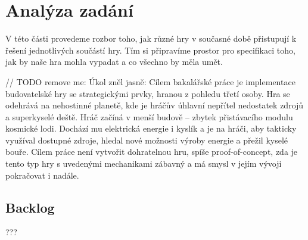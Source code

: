 
\chapter{Analýza zadání}

V této části provedeme rozbor toho, jak různé hry v současné době přistupují k řešení jednotlivých součástí hry. Tím si připravíme prostor pro specifikaci toho, jak by naše hra mohla vypadat a co všechno by měla umět.

// TODO remove me:
Úkol zněl jasně: Cílem bakalářské práce je implementace budovatelské hry se strategickými prvky, hranou z pohledu třetí osoby. Hra se odehrává na nehostinné planetě, kde je hráčův úhlavní nepřítel nedostatek zdrojů a superkyselé deště. Hráč začíná v menší budově – zbytek přistávacího modulu kosmické lodi. Dochází mu elektrická energie i kyslík a je na hráči, aby takticky využíval dostupné zdroje, hledal nové možnosti výroby energie a přežil kyselé bouře. Cílem práce není vytvořit dohratelnou hru, spíše proof-of-concept, zda je tento typ hry s uvedenými mechanikami zábavný a má smysl v jejím vývoji pokračovat i nadále.







\section{Backlog}


???


